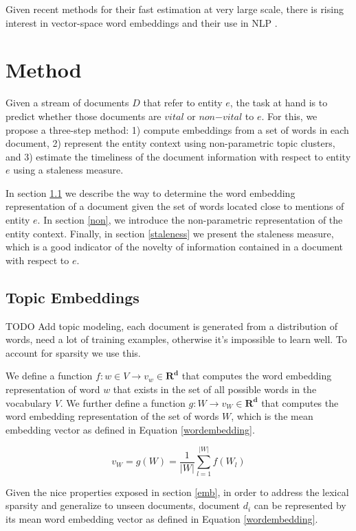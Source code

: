 \documentclass{article}
\begin{document}
Given recent methods for their fast estimation at very large scale, there is rising interest in vector-space word embeddings and their use in NLP \cite{Arvind14}.

\section{Method}
\label{approach}

Given a stream of documents $D$ that refer to entity $e$, the task at hand is to predict whether those documents are $vital$ or $non\mathord{-}vital$ to $e$. For this, we propose a three-step method: 1) compute embeddings from a set of words in each document, 2) represent the entity context using non-parametric topic clusters, and 3) estimate the timeliness of the document information with respect to entity $e$ using a staleness measure.

In section \ref{docwordemb} we describe the way to determine the word embedding representation of a document given the set of words located close to mentions of entity $e$. In section \ref{non}, we introduce the non-parametric representation of the entity context. Finally, in section \ref{staleness} we present the staleness measure, which is a good indicator of the novelty of information contained in a document with respect to $e$.

\subsection{Topic Embeddings}
\label{docwordemb}

TODO Add topic modeling, each document is generated from a distribution of words, need a lot of training examples, otherwise it's impossible to learn well. To account for sparsity we use this.

We define a function $f : w \in V \rightarrow v_w \in \mathbf{R^d}$ that computes the word embedding representation of word $w$ that exists in the set of all possible words in the vocabulary $V$. We further define a function $g : W \rightarrow v_W \in \mathbf{R^d}$ that computes the word embedding representation of the set of words $W$, which is the mean embedding vector as defined in Equation \ref{wordembedding}.

\begin{equation}
\label{wordembedding}
v_W = g(W) = \frac{1}{|W|} \sum_{l=1}^{|W|}{f(W_l)}
\end{equation}

Given the nice properties exposed in section \ref{emb}, in order to address the lexical sparsity and generalize to unseen documents, document $d_i$ can be represented by its mean word embedding vector as defined in Equation \ref{wordembedding}.
\end{document}
